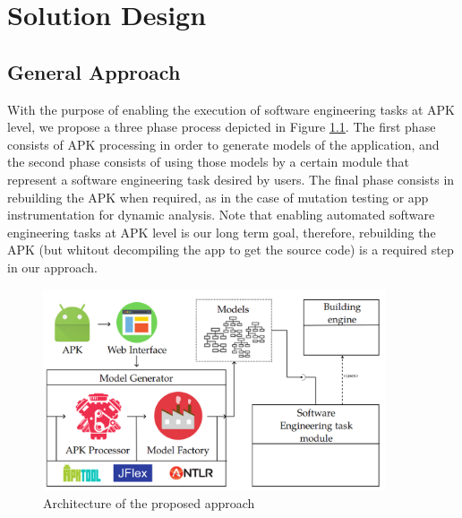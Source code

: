
\chapter{Solution Design} %

\label{ChapterX} %

\section{General Approach} \label{sec:generalApproach}

With the purpose of enabling the execution of software engineering tasks at APK level, we propose a three phase process depicted in Figure \ref{fig:proposeApproach}. The first phase consists of APK processing in order to generate models of the application, and the second phase consists of using those models by a certain module that represent a software engineering task desired by users. The final phase consists in rebuilding the APK when required, as in the case of mutation testing or app instrumentation for dynamic analysis. Note that enabling automated software engineering tasks at APK level is our long term goal, therefore, rebuilding the APK (but whitout decompiling the app to get the source code) is a required step in our approach.

\begin{figure}[htbp]
	\centerline{\includegraphics[width=0.9\textwidth]{Figures/proposedApproach.png}}
	\caption{Architecture of the proposed approach}
	\label{fig:proposeApproach}
\end{figure}

